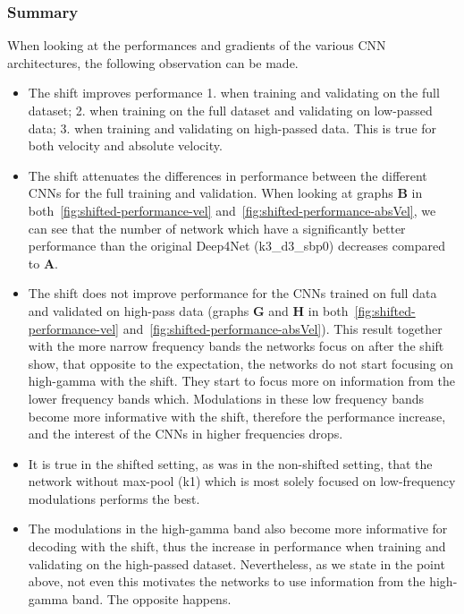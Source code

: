 \subsubsection{Summary}\label{subsubsec:centre-shiftig-summary}
When looking at the performances and gradients of the various CNN architectures, the following observation can be made.
\begin{itemize}
    \item The shift improves performance 1. when training and validating on the full dataset; 2. when training on the full dataset and validating on low-passed data;
    3. when training and validating on high-passed data. This is true for both velocity and absolute velocity.
    \item The shift attenuates the differences in performance between the different CNNs for the full training and validation.
    When looking at graphs \textbf{B} in both~\ref{fig:shifted-performance-vel} and~\ref{fig:shifted-performance-absVel}, we can see that the number of network which have a significantly better performance than the original Deep4Net (k3\_d3\_sbp0) decreases compared to \textbf{A}.
    \item The shift does not improve performance for the CNNs trained on full data and validated on high-pass data (graphs \textbf{G} and \textbf{H} in both~\ref{fig:shifted-performance-vel} and~\ref{fig:shifted-performance-absVel}).
    This result together with the more narrow frequency bands the networks focus on after the shift show, that opposite to the expectation, the networks do not start focusing on high-gamma with the shift.
    They start to focus more on information from the lower frequency bands which.
    Modulations in these low frequency bands become more informative with the shift, therefore the performance increase, and the interest of the CNNs in higher frequencies drops.
    \item It is true in the shifted setting, as was in the non-shifted setting, that the network without max-pool (k1) which is most solely focused on low-frequency modulations performs the best.
    \item The modulations in the high-gamma band also become more informative for decoding with the shift, thus the increase in performance when training and validating on the high-passed dataset.
    Nevertheless, as we state in the point above, not even this motivates the networks to use information from the high-gamma band.
    The opposite happens.
\end{itemize}


